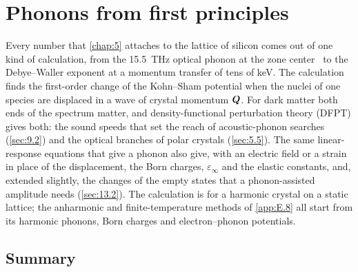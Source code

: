 \chapter{Phonons from first principles}\label{chap:25}

Every number that \cref{chap:5} attaches to the lattice of silicon comes out of one kind of calculation, from the \SI{15.5}{THz} optical phonon at the zone center~\cite{nilsson1972study} to the Debye--Waller exponent at a momentum transfer of tens of keV. The calculation finds the first-order change of the Kohn--Sham potential when the nuclei of one species are displaced in a wave of crystal momentum $\bm{Q}$. For dark matter both ends of the spectrum matter, and density-functional perturbation theory (DFPT) gives both: the sound speeds that set the reach of acoustic-phonon searches (\cref{sec:9.2}) and the optical branches of polar crystals (\cref{sec:5.5}). The same linear-response equations that give a phonon also give, with an electric field or a strain in place of the displacement, the Born charges, $\varepsilon_\infty$ and the elastic constants, and, extended slightly, the changes of the empty states that a phonon-assisted amplitude needs (\cref{sec:13.2}). The calculation is for a harmonic crystal on a static lattice; the anharmonic and finite-temperature methods of \cref{app:E.8} all start from its harmonic phonons, Born charges and electron--phonon potentials.





\section*{Summary}

